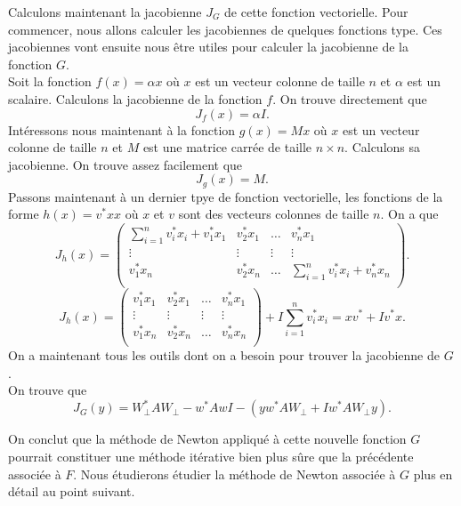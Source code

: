 Calculons maintenant la jacobienne $J_G$ de cette fonction vectorielle. Pour commencer, nous allons calculer les jacobiennes de quelques fonctions type. Ces jacobiennes vont ensuite nous être utiles pour calculer la jacobienne de la fonction $G$.\\
Soit la fonction $f(x) = \alpha x$ où $x$ est un vecteur colonne de taille $n$ et $\alpha$ est un scalaire. Calculons la jacobienne de la fonction $f$. On trouve directement que $$J_f(x) = \alpha I.$$
Intéressons nous maintenant à la fonction $g(x) = Mx$ où $x$ est un vecteur colonne de taille $n$ et $M$ est une matrice carrée de taille $n \times n$. Calculons sa jacobienne. On trouve assez facilement que $$J_g(x) = M.$$
Passons maintenant à un dernier tpye de fonction vectorielle, les fonctions de la forme $h(x) = v^* x x$ où $x$ et $v$ sont des vecteurs colonnes de taille $n$. On a que 
$$J_h(x) =
\left(\begin{array}{cccc}
\sum_{i=1}^{n}{v_i^* x_i} + v_1^* x_1 & v_2^* x_1 & \hdots & v_n^* x_1 \\
\vdots & \vdots & \vdots & \vdots\\
v_1^* x_n & v_2^* x_n & \hdots & \sum_{i=1}^{n}{v_i^* x_i} + v_n^* x_n \\
\end{array}\right).$$
$$J_h(x) =
\left(\begin{array}{cccc}
v_1^* x_1 & v_2^* x_1 & \hdots & v_n^* x_1 \\
\vdots & \vdots & \vdots & \vdots\\
v_1^* x_n & v_2^* x_n & \hdots & v_n^* x_n \\
\end{array}\right) + I\sum_{i=1}^{n}{v_i^* x_i} = xv^*+Iv^*x.
$$
On a maintenant tous les outils dont on a besoin pour trouver la jacobienne de $G$.\\
On trouve que $$J_G(y) = W_{\bot}^*AW_{\bot} - w^*AwI - (yw^*AW_{\bot}+Iw^*AW_{\bot}y).$$

On conclut que la méthode de Newton appliqué à cette nouvelle fonction $G$ pourrait constituer une méthode itérative bien plus sûre que la précédente associée à $F$. Nous étudierons étudier la méthode de Newton associée à $G$ plus en détail au point suivant. 

















 
